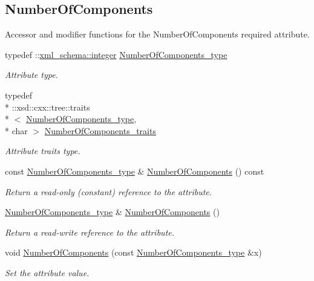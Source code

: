 \subsection*{Number\+Of\+Components}
\label{_amgrp2a0e258c3f78050b74e96bb0ed643748}%
Accessor and modifier functions for the Number\+Of\+Components required attribute. \begin{DoxyCompactItemize}
\item 
typedef \+::\hyperlink{namespacexml__schema_aaaea7c8ce4dfbe26cc52c91c29c97b7c}{xml\+\_\+schema\+::integer} \hyperlink{classDataArray__t_aac602cec132f6e771f7fa3be1d19c16f}{Number\+Of\+Components\+\_\+type}
\begin{DoxyCompactList}\small\item\em Attribute type. \end{DoxyCompactList}\item 
typedef \\*
\+::xsd\+::cxx\+::tree\+::traits\\*
$<$ \hyperlink{classDataArray__t_aac602cec132f6e771f7fa3be1d19c16f}{Number\+Of\+Components\+\_\+type}, \\*
char $>$ \hyperlink{classDataArray__t_a1112148f87db2c0ba05323377d9f0427}{Number\+Of\+Components\+\_\+traits}
\begin{DoxyCompactList}\small\item\em Attribute traits type. \end{DoxyCompactList}\item 
const \hyperlink{classDataArray__t_aac602cec132f6e771f7fa3be1d19c16f}{Number\+Of\+Components\+\_\+type} \& \hyperlink{classDataArray__t_a715a5b58a694d49499591bfea3a282ae}{Number\+Of\+Components} () const 
\begin{DoxyCompactList}\small\item\em Return a read-\/only (constant) reference to the attribute. \end{DoxyCompactList}\item 
\hyperlink{classDataArray__t_aac602cec132f6e771f7fa3be1d19c16f}{Number\+Of\+Components\+\_\+type} \& \hyperlink{classDataArray__t_a6f80fc5ce05d51d4292c698464d4ace3}{Number\+Of\+Components} ()
\begin{DoxyCompactList}\small\item\em Return a read-\/write reference to the attribute. \end{DoxyCompactList}\item 
void \hyperlink{classDataArray__t_a755fae9b31318f98a3d21beba16f2841}{Number\+Of\+Components} (const \hyperlink{classDataArray__t_aac602cec132f6e771f7fa3be1d19c16f}{Number\+Of\+Components\+\_\+type} \&x)
\begin{DoxyCompactList}\small\item\em Set the attribute value. \end{DoxyCompactList}\end{DoxyCompactItemize}
